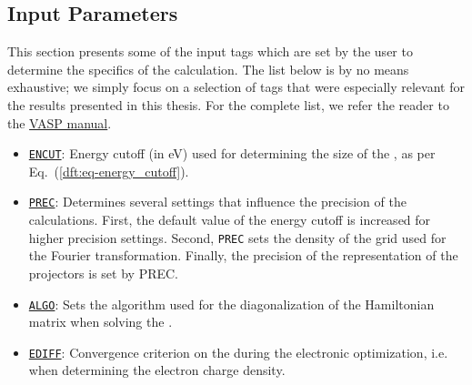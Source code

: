 \begin{refsection}
\subsection{Input Parameters} \label{appendix:sec-input} 
 
This section presents some of the input tags which are set by 
the user to determine the specifics of the calculation. The list below is by 
no means exhaustive; we simply focus on a selection of tags that were 
especially relevant for the results presented in this thesis. For the complete 
list, we refer the reader to the 
\href{https://www.vasp.at/wiki/index.php/The_VASP_Manual}{VASP manual}. 
 
\begin{itemize} 
 
 \label{appendix:sec-ENCUT} 
\item \href{https://cms.mpi.univie.ac.at/wiki/index.php/ENCUT}{\texttt{ENCUT}}: 
Energy cutoff (in \si{\electronvolt}) used for determining the size of the 
, as per 
Eq.~(\ref{dft:eq-energy_cutoff}).
 
 \label{appendix:sec-PREC} 
\item \href{https://cms.mpi.univie.ac.at/wiki/index.php/PREC}{\texttt{PREC}}: 
Determines several settings that influence the precision of the calculations. 
First, the default value of the energy cutoff is increased for higher precision 
settings. Second, \texttt{PREC} sets the density of the grid used for the 
Fourier transformation. Finally, the precision of the representation of the 
 projectors is set by PREC.
 
 \label{appendix:sec-ALGO} 
\item \href{https://cms.mpi.univie.ac.at/wiki/index.php/ALGO}{\texttt{ALGO}}: 
Sets the algorithm used for the diagonalization of the Hamiltonian matrix 
when solving the .

 \label{appendix:sec-EDIFF} 
\item \href{https://cms.mpi.univie.ac.at/wiki/index.php/EDIFF}{\texttt{EDIFF}}: 
Convergence criterion on the  
during the electronic optimization, i.e. when determining the electron charge 
density.
 

\end{itemize}
\end{refsection}
